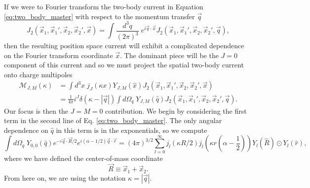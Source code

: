 \documentclass{book}[12pt]
\begin{document}
If we were to Fourier transform the two-body current in Equation \ref{eq:two_body_master} with respect to the momentum transfer $\vec{q}$
\begin{equation}
J_2(\vec{x}_1,\vec{x}_1',\vec{x}_2,\vec{x}_2',\vec{x})=\int \frac{d^3q}{(2\pi)^3} \;e^{i\vec{q}\cdot\vec{x}}J_2(\vec{x}_1,\vec{x}_1',\vec{x}_2,\vec{x}_2',\vec{q}),
\end{equation}
then the resulting position space current will exhibit a complicated dependence on the Fourier transform coordinate $\vec{x}$. The dominant piece will be the $J=0$ component of this current and so we must project the spatial two-body current onto charge multipoles
\begin{equation}
\begin{split}
\mathcal{M}_{J,M}(\kappa)&=\int d^3x \;j_J(\kappa x)Y_{J,M}(\hat{x})J_2(\vec{x}_1,\vec{x}_1',\vec{x}_2,\vec{x}_2',\vec{x})\\
&=\frac{1}{4\pi}i^J\delta(\kappa-|\vec{q}|)\int d\Omega_q\; Y_{J,M}(\hat{q})J_2(\vec{x}_1,\vec{x}_1',\vec{x}_2,\vec{x}_2',\vec{q}).
\end{split}
\end{equation}
Our focus is then the $J=M=0$ contribution. We begin by considering the first term in the second line of Eq. \ref{eq:two_body_master}. The only angular dependence on $\hat{q}$ in this term is in the exponentials, so we compute
\begin{equation}
\int d\Omega_q\;Y_{0,0}(\hat{q})e^{-i\vec{q}\cdot\vec{R}/2}e^{i(\alpha-1/2)\vec{q}\cdot\vec{r}}=(4\pi)^{3/2}\sum_{l=0}^{\infty}j_l(\kappa R/2)j_l\left(\kappa r(\alpha-\frac{1}{2})\right)Y_l(\hat{R})\odot Y_l(\hat{r}),
\end{equation}
where we have defined the center-of-mass coordinate
\begin{equation}
\vec{R}\equiv \vec{x}_1+\vec{x}_2.
\end{equation}
From here on, we are using the notation $\kappa=|\vec{q}|$.
\end{document}
